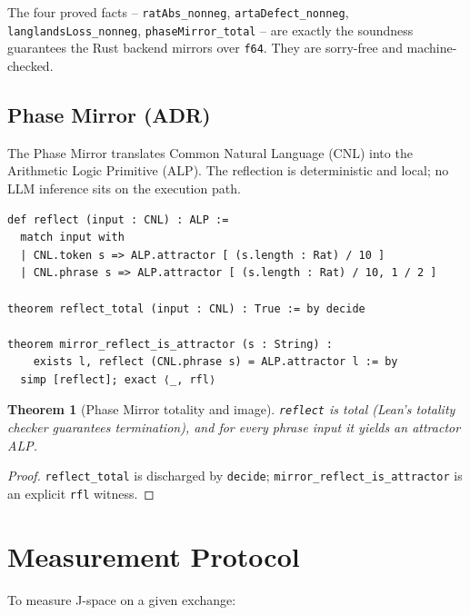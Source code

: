 \documentclass[11pt]{article}
\newtheorem{theorem}{Theorem}[section]
\theoremstyle{definition}
\begin{document}
The four proved facts -- \texttt{ratAbs\_nonneg}, \texttt{artaDefect\_nonneg},
\texttt{langlandsLoss\_nonneg}, \texttt{phaseMirror\_total} -- are exactly the
soundness guarantees the Rust backend mirrors over \texttt{f64}. They are
sorry-free and machine-checked.

\subsection{Phase Mirror (ADR)}

The Phase Mirror translates Common Natural Language (CNL) into the Arithmetic
Logic Primitive (ALP). The reflection is deterministic and local; no LLM
inference sits on the execution path.

\begin{lstlisting}
def reflect (input : CNL) : ALP :=
  match input with
  | CNL.token s => ALP.attractor [ (s.length : Rat) / 10 ]
  | CNL.phrase s => ALP.attractor [ (s.length : Rat) / 10, 1 / 2 ]

theorem reflect_total (input : CNL) : True := by decide

theorem mirror_reflect_is_attractor (s : String) :
    exists l, reflect (CNL.phrase s) = ALP.attractor l := by
  simp [reflect]; exact ⟨_, rfl⟩
\end{lstlisting}

\begin{theorem}[Phase Mirror totality and image]
\label{thm:pm}
  \texttt{reflect} is total (Lean's totality checker guarantees termination),
  and for every phrase input it yields an attractor ALP.
\end{theorem}

\begin{proof}
  \texttt{reflect\_total} is discharged by \texttt{decide};
  \texttt{mirror\_reflect\_is\_attractor} is an explicit \texttt{rfl}
  witness.
\end{proof}

\section{Measurement Protocol}
\label{sec:protocol}

To measure J-space on a given exchange:
\end{document}
